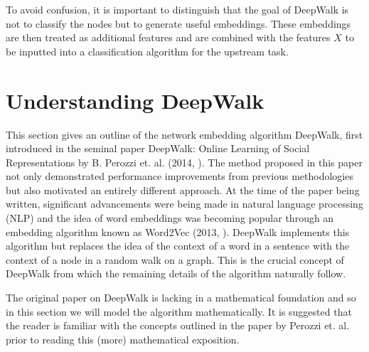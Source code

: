 \documentclass[a4paper]{article}
\begin{document}
To avoid confusion, it is important to distinguish that the goal of DeepWalk is
not to classify the nodes but to generate useful embeddings. These embeddings
are then treated as additional features and are combined with the features $X$
to be inputted into a classification algorithm for the upstream task.
\section{Understanding DeepWalk}
This section gives an outline of the network embedding algorithm
DeepWalk, first introduced in the seminal paper DeepWalk: Online Learning of
Social Representations by B. Perozzi et. al. (2014, \cite{deepwalk}). The method proposed in
this paper not only demonstrated performance improvements from previous methodologies but
also motivated an entirely different approach. At the time of the paper being
written, significant advancements were being made in natural language processing (NLP)
and the idea of word embeddings was becoming popular through an embedding
algorithm known as Word2Vec (2013, \cite{mikolov2013efficient,mikolov2013distributed}).
DeepWalk implements this algorithm but replaces the idea of the context of a word in
a sentence with the context of a node in a random walk on a graph. This is the
crucial concept of DeepWalk from which the remaining details of the algorithm naturally follow.

The original paper on DeepWalk is lacking in a mathematical foundation and so in
this section we will model the algorithm mathematically. It is suggested that the reader
is familiar with the concepts outlined in the paper by Perozzi et. al. prior to
reading this (more) mathematical exposition.
\end{document}
